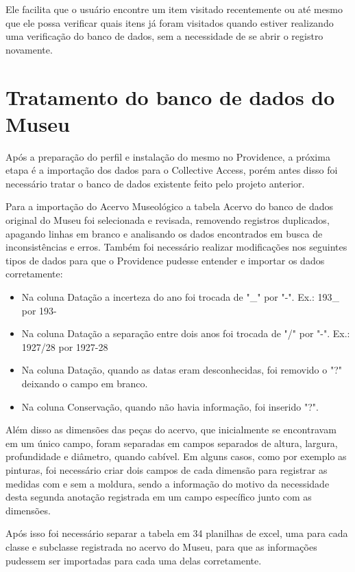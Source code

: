 \documentclass[a4paper,12pt,oneside,onecolumn,final,fleqn]{repUERJ}
\begin{document}
Ele facilita que o usuário encontre um item visitado recentemente ou até mesmo que ele possa verificar quais itens já foram visitados quando estiver realizando uma verificação do banco de dados, sem a necessidade de se abrir o registro novamente.

\section{Tratamento do banco de dados do Museu}

Após a preparação do perfil e instalação do mesmo no Providence, a próxima etapa é a importação dos dados para o Collective Access, porém antes disso foi necessário tratar o banco de dados existente feito pelo projeto anterior.

Para a importação do Acervo Museológico a tabela Acervo do banco de dados original do Museu foi selecionada e revisada, removendo registros duplicados, apagando linhas em branco e analisando os dados encontrados em busca de inconsistências e erros. Também foi necessário realizar modificações nos seguintes tipos de dados para que o Providence pudesse entender e importar os dados corretamente:

\begin{itemize}
	\item Na coluna Datação a incerteza do ano foi trocada de "\_" por "-".
	Ex.: 193\_ por 193-
	\item Na coluna Datação a separação entre dois anos foi trocada de "/" por "-". 
	Ex.: 1927/28 por 1927-28
	\item Na coluna Datação, quando as datas eram desconhecidas, foi removido o "?" deixando o campo em branco.
	\item Na coluna Conservação, quando não havia informação, foi inserido "?".
\end{itemize}

Além disso as dimensões das peças do acervo, que inicialmente se encontravam em um único campo, foram separadas em campos separados de altura, largura, profundidade e diâmetro, quando cabível. Em alguns casos, como por exemplo as pinturas, foi necessário criar dois campos de cada dimensão para registrar as medidas com e sem a moldura, sendo a informação do motivo da necessidade desta segunda anotação registrada em um campo específico junto com as dimensões.

Após isso foi necessário separar a tabela em 34 planilhas de excel, uma para cada classe e subclasse registrada no acervo do Museu, para que as informações pudessem ser importadas para cada uma delas corretamente.
\end{document}
